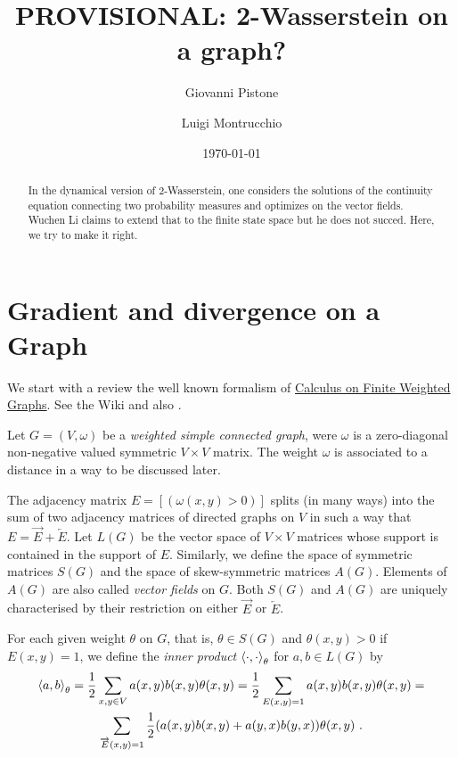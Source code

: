 \documentclass[12pt,a4paper]{amsart}
\title{PROVISIONAL: 2-Wasserstein on a graph?}
\author{Giovanni Pistone}
\author{Luigi Montrucchio}
\date{\today}
\theoremstyle{definition}
\begin{document}
\maketitle

\begin{abstract}
  In the dynamical version of 2-Wasserstein, one considers the
  solutions of the continuity equation connecting two probability
  measures and optimizes on the vector fields. Wuchen Li claims to
  extend that to the finite state space but he does not succed. Here,
  we try to make it right.
\end{abstract}
\section{Gradient and divergence on a Graph}

We start with a review the well known formalism of
\href{https://en.wikipedia.org/wiki/Calculus_on_finite_weighted_graphs}
{Calculus on Finite Weighted Graphs}. See the Wiki and also
\citep{bollobas:1998}.

Let $G = (V,\omega)$ be a \emph{weighted simple connected graph}, were
$\omega$ is a zero-diagonal non-negative valued symmetric $V \times V$
matrix. The weight $\omega$ is associated to a distance in a way to be
discussed later.

The adjacency matrix $E = [(\omega(x,y) > 0)]$ splits (in many
ways) into the sum of two adjacency matrices of directed graphs on $V$
in such a way that $E = \overrightarrow E + \overleftarrow E$. Let
$L(G)$ be the vector space of $V \times V$ matrices whose support is
contained in the support of $E$. Similarly, we define the space of
symmetric matrices $S(G)$ and the space of skew-symmetric matrices
$A(G)$. Elements of $A(G)$ are also called \emph{vector fields} on
$G$. Both $S(G)$ and $A(G)$ are uniquely characterised by their
restriction on either $\overrightarrow E$ or $\overleftarrow E$.

For each given weight $\theta$ on $G$, that is, $\theta \in S(G)$ and
$\theta(x,y) > 0$ if $E(x,y)=1$, we define the \emph{inner product}
$\left\langle\cdot,\cdot\right\rangle_{\theta}$ for $a,b \in L(G)$ by
\begin{multline*}
  \left\langle a,b\right\rangle_{\theta} = \frac 12 \sum _ {x,y \in V} a(x,y)
  b(x,y)\theta(x,y) = \frac 12 \sum _ {E(x,y)=1} a(x,y)
  b(x,y)\theta(x,y) = \\ \sum_{\overrightarrow E(x,y)=1}
  \frac12(a(x,y)b(x,y)+a(y,x)b(y,x)) \theta(x,y)\ .
\end{multline*}
\end{document}
